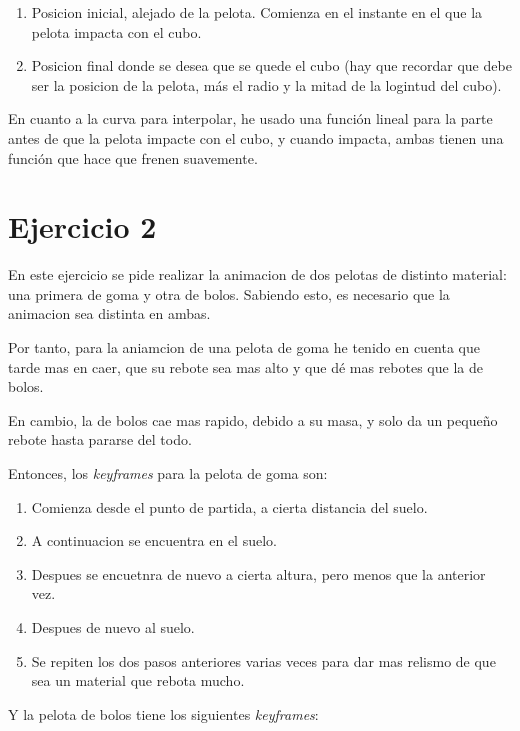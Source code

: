 \documentclass{article}
\begin{document}
\begin{enumerate}
    \item Posicion inicial, alejado de la pelota. Comienza en el instante en el que la pelota impacta con el cubo.
    \item Posicion final donde se desea que se quede el cubo (hay que recordar que debe ser la posicion de la pelota, más el radio y la mitad de la logintud del cubo).
\end{enumerate}

En cuanto a la curva para interpolar, he usado una función lineal para la parte antes de que la pelota impacte con el cubo, y cuando impacta, ambas tienen una función que hace que frenen suavemente.



\section{Ejercicio 2}

En este ejercicio se pide realizar la animacion de dos pelotas de distinto material: una primera de goma y otra de bolos. Sabiendo esto, es necesario que la animacion sea distinta en ambas.

Por tanto, para la aniamcion de una pelota de goma he tenido en cuenta que tarde mas en caer, que su rebote sea mas alto y que dé mas rebotes que la de bolos.

En cambio, la de bolos cae mas rapido, debido a su masa, y solo da un pequeño rebote hasta pararse del todo.


Entonces, los \textit{keyframes} para la pelota de goma son:

\begin{enumerate}
    \item Comienza desde el punto de partida, a cierta distancia del suelo.
    \item A continuacion se encuentra en el suelo.
    \item Despues se encuetnra de nuevo a cierta altura, pero menos que la anterior vez.
    \item Despues de nuevo al suelo.
    \item Se repiten los dos pasos anteriores varias veces para dar mas relismo de que sea un material que rebota mucho.
\end{enumerate}


Y la pelota de bolos tiene los siguientes \textit{keyframes}:
\end{document}
